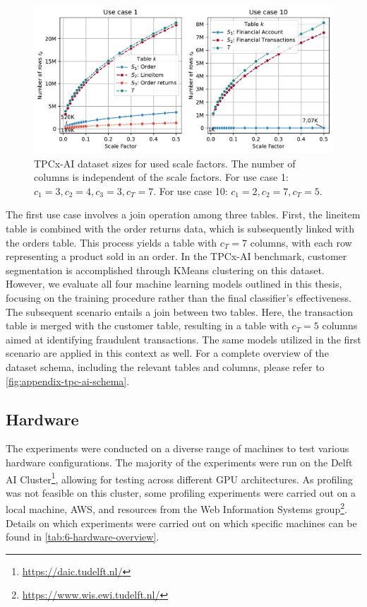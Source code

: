 \begin{figure}
  \centering
  \includegraphics[width=\linewidth]{chapters/06_evaluation/figures/tpcx-ai-data-chars.pdf}
  \caption[TPCx-AI dataset sizes for used scale factors.]{TPCx-AI dataset sizes for used scale factors. The number of columns is independent of the scale factors. For use case 1: $c_1=3, c_2=4, c_3=3, c_T=7$. For use case 10: $c_1=2, c_2=7, c_T=5$.}
  \label{fig:tpcx-ai-data-chars}
\end{figure}


The first use case involves a join operation among three tables. First, the lineitem table is combined with the order returns data, which is subsequently linked with the orders table. This process yields a table with $c_T=7$ columns, with each row representing a product sold in an order. In the TPCx-AI benchmark, customer segmentation is accomplished through KMeans clustering on this dataset. However, we evaluate all four machine learning models outlined in this thesis, focusing on the training procedure rather than the final classifier's effectiveness. The subsequent scenario entails a join between two tables. Here, the transaction table is merged with the customer table, resulting in a table with $c_T=5$ columns aimed at identifying fraudulent transactions. The same models utilized in the first scenario are applied in this context as well. For a complete overview of the dataset schema, including the relevant tables and columns, please refer to \autoref{fig:appendix-tpc-ai-schema}.

\subsection{Hardware}
\label{subsec:6-hardware}
The experiments were conducted on a diverse range of machines to test various hardware configurations. The majority of the experiments were run on the Delft AI Cluster\footnote{\url{https://daic.tudelft.nl/}}, allowing for testing across different GPU architectures. As profiling was not feasible on this cluster, some profiling experiments were carried out on a local machine, AWS, and resources from the Web Information Systems group\footnote{\url{https://www.wis.ewi.tudelft.nl/}}. Details on which experiments were carried out on which specific machines can be found in \autoref{tab:6-hardware-overview}.

